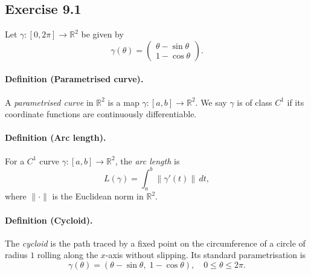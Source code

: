 \documentclass[11pt,a4paper]{article}
\begin{document}
\subsection*{Exercise 9.1}

Let $\gamma:[0,2\pi]\to\mathbb{R}^2$ be given by
\[
\gamma(\theta)=\begin{pmatrix}\theta-\sin\theta\\ 1-\cos\theta\end{pmatrix}.
\]

\paragraph{Definition (Parametrised curve).}
A \emph{parametrised curve} in $\mathbb{R}^2$ is a map $\gamma:[a,b]\to\mathbb{R}^2$.
We say $\gamma$ is of class $C^1$ if its coordinate functions are continuously differentiable.  

\paragraph{Definition (Arc length).}
For a $C^1$ curve $\gamma:[a,b]\to\mathbb{R}^2$, the \emph{arc length} is
\[
L(\gamma)=\int_a^b \|\gamma'(t)\|\,dt,
\]
where $\|\cdot\|$ is the Euclidean norm in $\mathbb{R}^2$.

\paragraph{Definition (Cycloid).}
The \emph{cycloid} is the path traced by a fixed point on the circumference of a circle of radius $1$ rolling along the $x$-axis without slipping.  
Its standard parametrisation is
\[
\gamma(\theta) = (\theta-\sin\theta,\;1-\cos\theta), \quad 0\leq \theta\leq 2\pi.
\]
\end{document}
